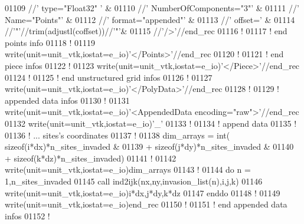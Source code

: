 \begin{DoxyCode}
01109                                 //\textcolor{stringliteral}{' type="Float32" '}              &
01110                                 //\textcolor{stringliteral}{' NumberOfComponents="3"'}       &
01111                                 //\textcolor{stringliteral}{' Name="Points"'}                &
01112                                 //\textcolor{stringliteral}{' format="appended"'}            &
01113                                 //\textcolor{stringliteral}{' offset='}                      &
01114                                 //\textcolor{stringliteral}{'"'}//trim(adjustl(coffset))//\textcolor{stringliteral}{'"'}&
01115                                 //\textcolor{stringliteral}{'/>'}//end\_rec
01116 \textcolor{comment}{!}
01117 \textcolor{comment}{! end points info}
01118 \textcolor{comment}{!}
01119 \textcolor{keyword}{write}(unit=unit\_vtk,iostat=e\_io)\textcolor{stringliteral}{'</Points>'}//end\_rec
01120 \textcolor{comment}{!}
01121 \textcolor{comment}{! end piece infos}
01122 \textcolor{comment}{!}
01123 \textcolor{keyword}{write}(unit=unit\_vtk,iostat=e\_io)\textcolor{stringliteral}{'</Piece>'}//end\_rec
01124 \textcolor{comment}{!}
01125 \textcolor{comment}{! end unstructured grid infos}
01126 \textcolor{comment}{!}
01127 \textcolor{keyword}{write}(unit=unit\_vtk,iostat=e\_io)\textcolor{stringliteral}{'</PolyData>'}//end\_rec
01128 \textcolor{comment}{!}
01129 \textcolor{comment}{! appended data infos}
01130 \textcolor{comment}{!}
01131 \textcolor{keyword}{write}(unit=unit\_vtk,iostat=e\_io)\textcolor{stringliteral}{'<AppendedData encoding="raw">'}//end\_rec
01132 \textcolor{keyword}{write}(unit=unit\_vtk,iostat=e\_io)\textcolor{stringliteral}{'\_'}
01133 \textcolor{comment}{!}
01134 \textcolor{comment}{! append data }
01135 \textcolor{comment}{!}
01136 \textcolor{comment}{! ... sites's coordinates}
01137 \textcolor{comment}{!}
01138 dim\_arrays =  int( sizeof(i*dx)*n\_sites\_invaded &
01139                  + sizeof(j*dy)*n\_sites\_invaded &
01140                  + sizeof(k*dz)*n\_sites\_invaded)
01141 \textcolor{comment}{!}
01142 \textcolor{keyword}{write}(unit=unit\_vtk,iostat=e\_io)dim\_arrays
01143 \textcolor{comment}{!}
01144 \textcolor{keyword}{do} n = 1,n\_sites\_invaded
01145    call ind2ijk(nx,ny,invasion\_list(n),i,j,k)
01146    \textcolor{keyword}{write}(unit=unit\_vtk,iostat=e\_io)i*dx,j*dy,k*dz
01147 \textcolor{keyword}{enddo}
01148 \textcolor{comment}{!}
01149 \textcolor{keyword}{write}(unit=unit\_vtk,iostat=e\_io)end\_rec
01150 \textcolor{comment}{!}
01151 \textcolor{comment}{! end appended data infos}
01152 \textcolor{comment}{!}

\end{DoxyCode}
